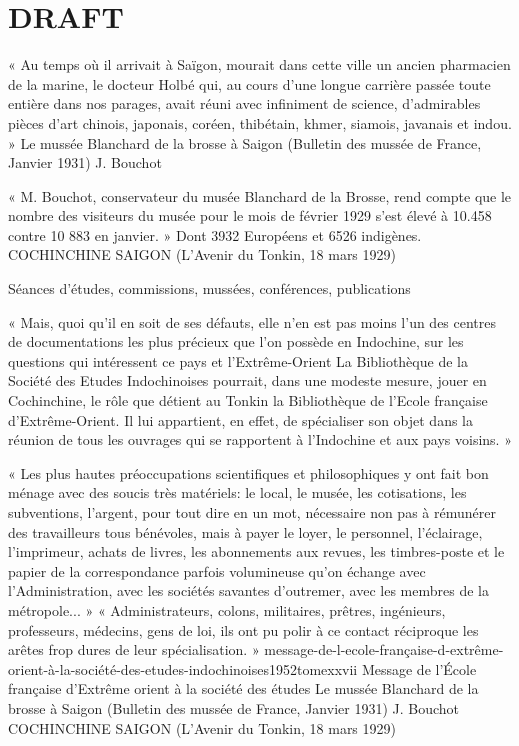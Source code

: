 
\part{DRAFT}
« Au temps où il arrivait à Saïgon, mourait dans cette ville un ancien pharmacien de la marine, le docteur Holbé qui, au cours d'une longue carrière passée toute entière dans nos parages, avait réuni avec infiniment de science, d'admirables pièces d'art chinois, japonais, coréen, thibétain, khmer, siamois, javanais et indou. »
Le mussée Blanchard de la brosse à Saigon (Bulletin des mussée de France, Janvier 1931) J. Bouchot

« M. Bouchot, conservateur du musée Blanchard de
la Brosse, rend compte que le nombre des visiteurs du musée pour le mois de février 1929 s’est élevé à 10.458 contre 10 883 en janvier. » Dont 3932 Européens et 6526 indigènes.
COCHINCHINE SAIGON
(L'Avenir du Tonkin, 18 mars 1929)

Séances d’études, commissions, mussées, conférences, publications

« Mais, quoi qu'il en soit de ses défauts, elle n'en est pas moins l’un des centres de documentations les plus précieux que l'on possède en Indochine, sur les questions qui intéressent ce pays et l'Extrême-Orient La Bibliothèque de la Société des Etudes Indochinoises pourrait, dans une modeste mesure, jouer en Cochinchine, le rôle que détient au Tonkin la Bibliothèque de l'Ecole française d’Extrême-Orient. Il lui appartient, en effet, de spécialiser son objet dans la réunion de tous les ouvrages qui se rapportent à l'Indochine et aux pays voisins. »\foot{\cite{}}

« Les plus hautes préoccupations scientifiques et philosophiques y ont fait bon ménage avec des soucis très matériels: le local, le musée, les cotisations, les subventions, l'argent, pour tout dire en un mot, nécessaire non pas à rémunérer des travailleurs tous bénévoles, mais à payer le loyer, le personnel, l'éclairage, l'imprimeur, achats de livres, les abonnements aux revues, les timbres-poste et le papier de la correspondance parfois volumineuse qu'on échange avec l'Administration, avec les sociétés savantes d'outremer, avec les membres de la métropole... »
\foot{\cite{}}
« Administrateurs, colons, militaires, prêtres, ingénieurs, professeurs, médecins, gens de loi, ils ont pu polir à ce contact réciproque les arêtes frop dures de leur spécialisation. » \foot{\cite{}}
message-de-l-ecole-française-d-extrême-orient-à-la-société-des-etudes-indochinoises1952tomexxvii
Message de l’École française d’Extrême orient à la société des études 
Le mussée Blanchard de la brosse à Saigon (Bulletin des mussée de France, Janvier 1931) J. Bouchot
COCHINCHINE SAIGON
(L'Avenir du Tonkin, 18 mars 1929)

